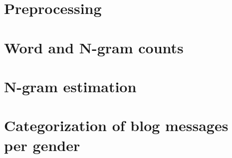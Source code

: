 \documentclass{eplDoc}
\begin{document}
\maketitle
\newpage
\addtocounter{section}{1}

\section{Preprocessing}

\section{Word and N-gram counts}

\section{N-gram estimation}

\section{Categorization of blog messages per gender}
\end{document}
